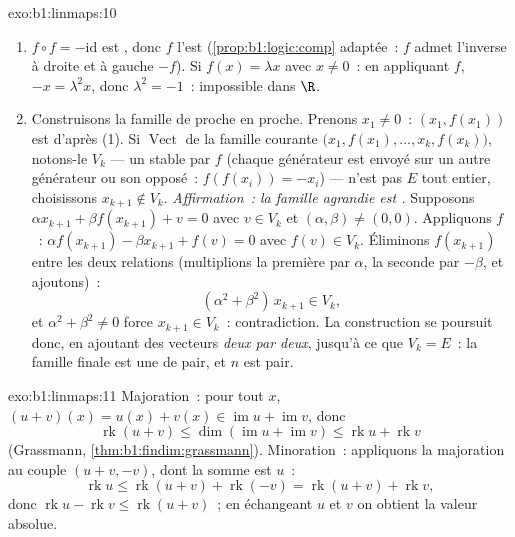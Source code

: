 \begin{solution}{exo:b1:linmaps:10}
\begin{enumerate}
  \item $f \circ f = -\mathrm{id}$ est , donc $f$ l'est
        (\cref{prop:b1:logic:comp} adaptée~: $f$ admet l'inverse à droite et
        à gauche $-f$). Si $f(x) = \lambda x$ avec $x \neq 0$~:
        en appliquant $f$, $-x = \lambda^2 x$, donc $\lambda^2 = -1$~:
        impossible dans $\R$.
  \item Construisons la famille de proche en proche. Prenons $x_1 \neq 0$~: $(x_1,
        f(x_1))$ est  d'après (1). Si $\operatorname{Vect}$ de la
        famille courante $\bigl(x_1, f(x_1), \dots, x_k,
        f(x_k)\bigr)$, notons-le $V_k$ --- un  stable par $f$
        (chaque générateur est envoyé sur un autre générateur ou son opposé~:
        $f(f(x_i)) = -x_i$) --- n'est pas $E$ tout entier, choisissons $x_{k+1}
        \notin V_k$. \emph{Affirmation~: la famille agrandie est .}
        Supposons $\alpha x_{k+1} + \beta f(x_{k+1}) + v = 0$ avec $v
        \in V_k$ et $(\alpha, \beta) \neq (0,0)$. Appliquons $f$~:
        $\alpha f(x_{k+1}) - \beta x_{k+1} + f(v) = 0$ avec $f(v)
        \in V_k$. Éliminons $f(x_{k+1})$ entre les deux relations
        (multiplions la première par $\alpha$, la seconde par $-\beta$, et
        ajoutons)~:
        \[
        (\alpha^2 + \beta^2)\, x_{k+1} \in V_k ,
        \]
        et $\alpha^2 + \beta^2 \neq 0$ force $x_{k+1} \in V_k$~:
        contradiction. La construction se poursuit donc, en ajoutant des vecteurs
        \emph{deux par deux}, jusqu'à ce que $V_k = E$~: la famille finale est une
         de  pair, et $n$ est pair.
\end{enumerate}
\end{solution}

\begin{solution}{exo:b1:linmaps:11}
Majoration~: pour tout $x$, $(u + v)(x) = u(x) + v(x) \in
\operatorname{im} u + \operatorname{im} v$, donc
\[
\operatorname{rk}(u + v)
\leq \dim(\operatorname{im} u + \operatorname{im} v)
\leq \operatorname{rk} u + \operatorname{rk} v
\]
(Grassmann, \cref{thm:b1:findim:grassmann}). Minoration~: appliquons
la majoration au couple $(u + v, -v)$, dont la somme est $u$~:
\[
\operatorname{rk} u \leq \operatorname{rk}(u + v) +
\operatorname{rk}(-v) = \operatorname{rk}(u + v) +
\operatorname{rk} v,
\]
donc $\operatorname{rk} u - \operatorname{rk} v \leq
\operatorname{rk}(u+v)$~; en échangeant $u$ et $v$ on obtient la valeur
absolue.
\end{solution}

